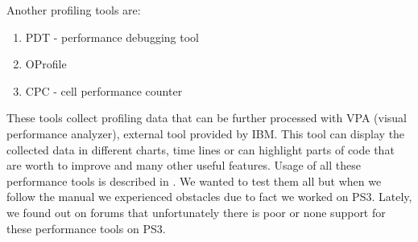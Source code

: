 \par
Another profiling tools are:
\begin{enumerate}
\item{PDT - performance debugging tool}
\item{OProfile}
\item{CPC - cell performance counter}
\end{enumerate}

These tools collect profiling data that can be further processed with VPA (visual performance analyzer), external tool provided by IBM.
This tool can display the collected data in different charts, time lines or can highlight parts of code that are worth to improve and many other useful features.
Usage of all these performance tools is described in \cite{performanceToolRef}.
We wanted to test them all but when we follow the manual we experienced obstacles due to fact we worked on PS3.
Lately, we found out on forums that unfortunately there is poor or none support for these performance tools on PS3.